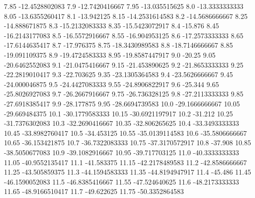            7.85   -12.4528802083
            7.9   -12.7420416667
           7.95    -13.035515625
            8.0   -13.3333333333
           8.05   -13.6355260417
            8.1       -13.942125
           8.15   -14.2531614583
            8.2   -14.5686666667
           8.25    -14.888671875
            8.3   -15.2132083333
           8.35   -15.5423072917
            8.4          -15.876
           8.45   -16.2143177083
            8.5   -16.5572916667
           8.55    -16.904953125
            8.6   -17.2573333333
           8.65   -17.6144635417
            8.7       -17.976375
           8.75   -18.3430989583
            8.8   -18.7146666667
           8.85    -19.091109375
            8.9   -19.4724583333
           8.95   -19.8587447917
            9.0           -20.25
           9.05   -20.6462552083
            9.1   -21.0475416667
           9.15    -21.453890625
            9.2   -21.8653333333
           9.25   -22.2819010417
            9.3       -22.703625
           9.35   -23.1305364583
            9.4   -23.5626666667
           9.45    -24.000046875
            9.5   -24.4427083333
           9.55   -24.8906822917
            9.6          -25.344
           9.65   -25.8026927083
            9.7   -26.2667916667
           9.75    -26.736328125
            9.8   -27.2113333333
           9.85   -27.6918385417
            9.9       -28.177875
           9.95   -28.6694739583
           10.0   -29.1666666667
          10.05    -29.669484375
           10.1   -30.1779583333
          10.15   -30.6921197917
           10.2          -31.212
          10.25   -31.7376302083
           10.3   -32.2690416667
          10.35    -32.806265625
           10.4   -33.3493333333
          10.45   -33.8982760417
           10.5       -34.453125
          10.55   -35.0139114583
           10.6   -35.5806666667
          10.65    -36.153421875
           10.7   -36.7322083333
          10.75   -37.3170572917
           10.8          -37.908
          10.85   -38.5050677083
           10.9   -39.1082916667
          10.95    -39.717703125
           11.0   -40.3333333333
          11.05   -40.9552135417
           11.1       -41.583375
          11.15   -42.2178489583
           11.2   -42.8586666667
          11.25    -43.505859375
           11.3   -44.1594583333
          11.35   -44.8194947917
           11.4          -45.486
          11.45   -46.1590052083
           11.5   -46.8385416667
          11.55    -47.524640625
           11.6   -48.2173333333
          11.65   -48.9166510417
           11.7       -49.622625
          11.75   -50.3352864583
